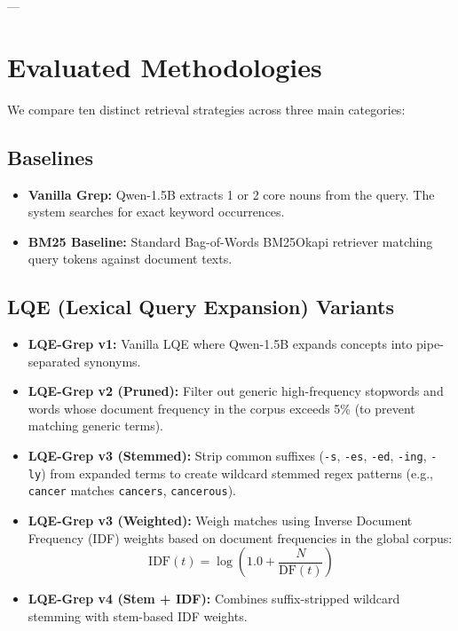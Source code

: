 \documentclass[11pt,a4paper]{article}
\begin{document}
---

\section{Evaluated Methodologies}

We compare ten distinct retrieval strategies across three main categories:

\subsection{Baselines}
\begin{itemize}
    \item \textbf{Vanilla Grep:} Qwen-1.5B extracts 1 or 2 core nouns from the query. The system searches for exact keyword occurrences.
    \item \textbf{BM25 Baseline:} Standard Bag-of-Words BM25Okapi retriever matching query tokens against document texts.
\end{itemize}

\subsection{LQE (Lexical Query Expansion) Variants}
\begin{itemize}
    \item \textbf{LQE-Grep v1:} Vanilla LQE where Qwen-1.5B expands concepts into pipe-separated synonyms.
    \item \textbf{LQE-Grep v2 (Pruned):} Filter out generic high-frequency stopwords and words whose document frequency in the corpus exceeds 5\% (to prevent matching generic terms).
    \item \textbf{LQE-Grep v3 (Stemmed):} Strip common suffixes (\texttt{-s}, \texttt{-es}, \texttt{-ed}, \texttt{-ing}, \texttt{-ly}) from expanded terms to create wildcard stemmed regex patterns (e.g., \texttt{cancer} matches \texttt{cancers}, \texttt{cancerous}).
    \item \textbf{LQE-Grep v3 (Weighted):} Weigh matches using Inverse Document Frequency (IDF) weights based on document frequencies in the global corpus:
    \begin{equation}
    \text{IDF}(t) = \log\left(1.0 + \frac{N}{\text{DF}(t)}\right)
    \end{equation}
    \item \textbf{LQE-Grep v4 (Stem + IDF):} Combines suffix-stripped wildcard stemming with stem-based IDF weights.
\end{itemize}
\end{document}

